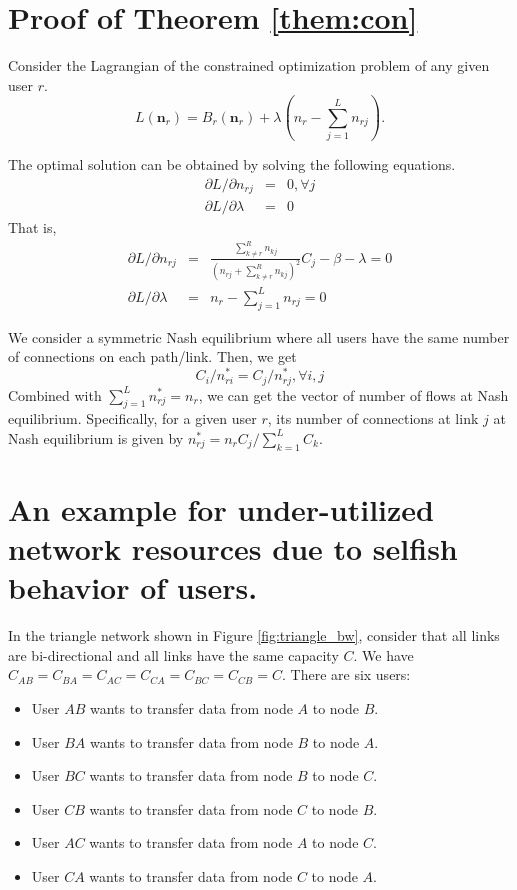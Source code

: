 \documentclass[conference]{IEEEtran}
\begin{document}
\bigskip
\section{Proof of Theorem \ref{them:con}}\label{appd:con}


Consider the Lagrangian of the constrained optimization problem of
any given user $r$.
$$
L(\mathbf{n}_r)=B_r(\mathbf{n}_r) + \lambda (n_r - \sum_{j=1}^L
n_{rj}).
$$

The optimal solution can be obtained by solving the following
equations.
\begin{eqnarray}
\partial{L}/\partial{n_{rj}} &=&0, \forall j \\
\partial{L}/\partial{\lambda} &=& 0
\end{eqnarray}
That is,
\begin{eqnarray}
\partial{L}/\partial{n_{rj}} &=& \frac{\sum_{k\ne r}^R n_{kj}}{
(n_{rj}+\sum_{k\ne r}^R n_{kj})^2} C_j - \beta - \lambda=0 \\
\partial{L}/\partial{\lambda} &=& n_r -
\sum_{j=1}^L n_{rj}=0
\end{eqnarray}

We consider a symmetric Nash equilibrium where all users have the
same number of connections on each path/link. Then, we get
$$
C_i/n^*_{ri} = C_j/n^*_{rj}, \forall i, j
$$
Combined with $\sum_{j=1}^L n^*_{rj}=n_r$, we can get the vector
of number of flows at Nash equilibrium. Specifically, for a given
user $r$, its number of connections at link $j$ at Nash
equilibrium is given by $n^*_{rj}=n_r C_j/\sum_{k=1}^L C_k.$

\bigskip
\section{An example for under-utilized network resources
due to selfish behavior of users.  } \label{appd:resource.util}

In the triangle network shown in Figure \ref{fig:triangle_bw},
consider that all links are bi-directional and all links have the
same capacity $C$. We have
$C_{AB}=C_{BA}=C_{AC}=C_{CA}=C_{BC}=C_{CB}=C$. There are six
users:
\begin{itemize}
\item User $AB$ wants to transfer data from node $A$ to node $B$.
\item User $BA$ wants to transfer data from node $B$ to node $A$.
\item User $BC$ wants to transfer data from node $B$ to node $C$.
\item User $CB$ wants to transfer data from node $C$ to node $B$.
\item User $AC$ wants to transfer data from node $A$ to node $C$.
\item User $CA$ wants to transfer data from node $C$ to node $A$.
\end{itemize}
\end{document}
